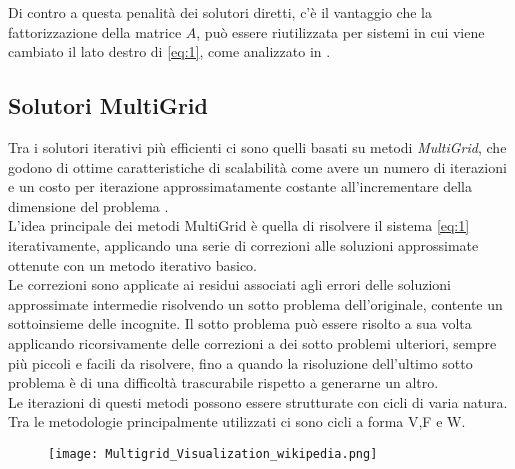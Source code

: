 Di contro a questa penalità dei solutori diretti, c'è il vantaggio che la fattorizzazione della matrice $A$, 
può essere riutilizzata per sistemi in cui viene cambiato il lato destro di \ref{eq:1},
come analizzato in \cite{sparseLinearSolverTR}.\\
\voidLine
\subsection{Solutori MultiGrid}
Tra i solutori iterativi più efficienti ci sono quelli basati su metodi \emph{MultiGrid}, 
che godono di ottime caratteristiche di scalabilità come avere un numero di iterazioni e 
un costo per iterazione approssimatamente costante all'incrementare della dimensione del problema \cite{AMGgeneralANY,Sp3MM4AMG}.\\
L'idea principale dei metodi MultiGrid è quella di 
risolvere il sistema \ref{eq:1} iterativamente, applicando una serie di correzioni 
alle soluzioni approssimate ottenute con un metodo iterativo basico.\\
Le correzioni sono applicate ai residui associati agli errori delle soluzioni approssimate intermedie
risolvendo un sotto problema dell'originale, contente un sottoinsieme delle incognite. %
Il sotto problema può essere risolto a sua volta applicando ricorsivamente delle correzioni
a dei sotto problemi ulteriori, sempre più piccoli e facili da risolvere,
fino a quando la risoluzione dell'ultimo sotto problema è di una difficoltà trascurabile 
rispetto a generarne un altro.\\
Le iterazioni di questi metodi possono essere strutturate con cicli di varia natura.
Tra le metodologie principalmente utilizzati ci sono cicli a forma V,F e W.\\
\begin{figure}[h!]
  \centering \texttt{[image: Multigrid\_Visualization\_wikipedia.png]}
  \caption[Rappresentazione grafica di un ciclo V di un solutore MultiGrid]
  \decoRule \label{fig:Multigrid_Visualization_wikipedia}
\end{figure}

